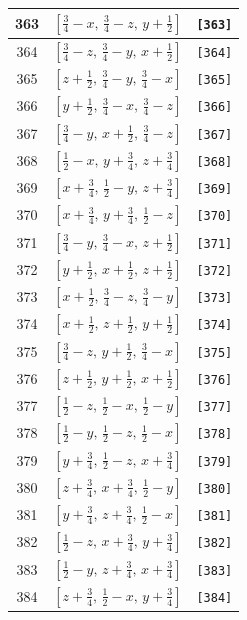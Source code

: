 \documentclass[fleqn,8pt]{jsarticle}
\begin{document}
\begin{longtable}{ccc}
363 & $\left[ \frac{3}{4} - x,\, \frac{3}{4} - z,\, y + \frac{1}{2} \right]$ & {\tt [363]} \\ \hline
364 & $\left[ \frac{3}{4} - z,\, \frac{3}{4} - y,\, x + \frac{1}{2} \right]$ & {\tt [364]} \\ \hline
365 & $\left[ z + \frac{1}{2},\, \frac{3}{4} - y,\, \frac{3}{4} - x \right]$ & {\tt [365]} \\ \hline
366 & $\left[ y + \frac{1}{2},\, \frac{3}{4} - x,\, \frac{3}{4} - z \right]$ & {\tt [366]} \\ \hline
367 & $\left[ \frac{3}{4} - y,\, x + \frac{1}{2},\, \frac{3}{4} - z \right]$ & {\tt [367]} \\ \hline
368 & $\left[ \frac{1}{2} - x,\, y + \frac{3}{4},\, z + \frac{3}{4} \right]$ & {\tt [368]} \\ \hline
369 & $\left[ x + \frac{3}{4},\, \frac{1}{2} - y,\, z + \frac{3}{4} \right]$ & {\tt [369]} \\ \hline
370 & $\left[ x + \frac{3}{4},\, y + \frac{3}{4},\, \frac{1}{2} - z \right]$ & {\tt [370]} \\ \hline
371 & $\left[ \frac{3}{4} - y,\, \frac{3}{4} - x,\, z + \frac{1}{2} \right]$ & {\tt [371]} \\ \hline
372 & $\left[ y + \frac{1}{2},\, x + \frac{1}{2},\, z + \frac{1}{2} \right]$ & {\tt [372]} \\ \hline
373 & $\left[ x + \frac{1}{2},\, \frac{3}{4} - z,\, \frac{3}{4} - y \right]$ & {\tt [373]} \\ \hline
374 & $\left[ x + \frac{1}{2},\, z + \frac{1}{2},\, y + \frac{1}{2} \right]$ & {\tt [374]} \\ \hline
375 & $\left[ \frac{3}{4} - z,\, y + \frac{1}{2},\, \frac{3}{4} - x \right]$ & {\tt [375]} \\ \hline
376 & $\left[ z + \frac{1}{2},\, y + \frac{1}{2},\, x + \frac{1}{2} \right]$ & {\tt [376]} \\ \hline
377 & $\left[ \frac{1}{2} - z,\, \frac{1}{2} - x,\, \frac{1}{2} - y \right]$ & {\tt [377]} \\ \hline
378 & $\left[ \frac{1}{2} - y,\, \frac{1}{2} - z,\, \frac{1}{2} - x \right]$ & {\tt [378]} \\ \hline
379 & $\left[ y + \frac{3}{4},\, \frac{1}{2} - z,\, x + \frac{3}{4} \right]$ & {\tt [379]} \\ \hline
380 & $\left[ z + \frac{3}{4},\, x + \frac{3}{4},\, \frac{1}{2} - y \right]$ & {\tt [380]} \\ \hline
381 & $\left[ y + \frac{3}{4},\, z + \frac{3}{4},\, \frac{1}{2} - x \right]$ & {\tt [381]} \\ \hline
382 & $\left[ \frac{1}{2} - z,\, x + \frac{3}{4},\, y + \frac{3}{4} \right]$ & {\tt [382]} \\ \hline
383 & $\left[ \frac{1}{2} - y,\, z + \frac{3}{4},\, x + \frac{3}{4} \right]$ & {\tt [383]} \\ \hline
384 & $\left[ z + \frac{3}{4},\, \frac{1}{2} - x,\, y + \frac{3}{4} \right]$ & {\tt [384]} \\
\end{longtable}
\end{document}
